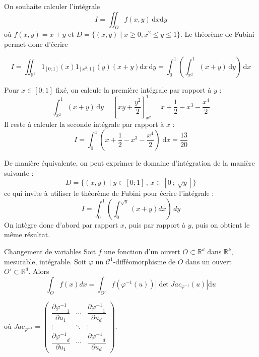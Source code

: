 	\begin{exemple}{}{}
		On souhaite calculer l'intégrale 
		$$I=\iint_D f(x,y)\,\mathrm{d}x\mathrm{d}y$$
		où $f(x,y)=x+y$ et $D = \{ (x,y) \mid x\ge0,x^2\le y\le1\}$.
		Le théorème de Fubini permet donc d'écrire 
		
		$$I = \iint_{\mathbb{R}^2} 1_{[0;1]}(x)  1_{[x^2;1]}(y) (x+y) \mathrm{d}x\,\mathrm{d}y = \int_0^1\left(\int_{x^2}^1(x+y)\,\mathrm{d}y\right)\,\mathrm{d}x $$
				
		Pour $x \in [0;1]$ fixé, on calcule la première intégrale par rapport à $y$ :
		$$\int_{x^2}^1(x+y)\,\mathrm{d}y=\left[xy + \frac{y^2}2\right]^{1}_{x^2}=x + \frac12- x^3 - \frac{x^4}2$$
		Il reste à calculer la seconde intégrale par rapport à $x$ :
		$$I=\int_0^1 \left(x + \frac12- x^3 - \frac{x^4}2\right) \; \mathrm{d}x =  \frac{13}{20}$$
		
		De manière équivalente, on peut exprimer le domaine d'intégration de la manière suivante :
		$$D= \{ (x,y) \mid y \in [0;1] \, , \, x \in [0~;~\sqrt{y}]\} $$
		ce qui invite à utiliser le théorème de Fubini pour écrire l'intégrale :
		$$I = \int_0^1\left(\int_0^{\sqrt{y}} (x+y){d}x\right)\,{d}y$$
		On intègre donc d'abord par rapport $x$, puis par rapport à $y$, puis on obtient le même résultat.
	\end{exemple}
	
	\begin{theoreme}{Changement de variables}{}
		Soit $f$ une fonction d'un ouvert $O \subset \mathbb{R}^d$ dans $\mathbb{R}^k$, mesurable, intégrable. Soit $\varphi$ un $\mathcal{C}^1$-difféomorphisme de $O$ dans un ouvert $O' \subset \mathbb{R}^d $. Alors 
		$$\int_{O} f(x)dx = \int_{O'} f\left(\varphi^{-1}(u)\right)|\det Jac_{\varphi^{-1}}(u)|\mathrm{d}u$$
		
		où $Jac_{\varphi^{-1}}=
		\begin{pmatrix} 
		\dfrac{\partial {\varphi^{-1}}_1}{\partial u_1} & \cdots & \dfrac{\partial {\varphi^{-1}}_1}{\partial u_d} \\
		\vdots & \ddots & \vdots \\
		\dfrac{\partial {\varphi^{-1}}_d}{\partial u_1} & \cdots & \dfrac{\partial {\varphi^{-1}}_d}{\partial u_d}
		\end{pmatrix}.$
	\end{theoreme}
	
